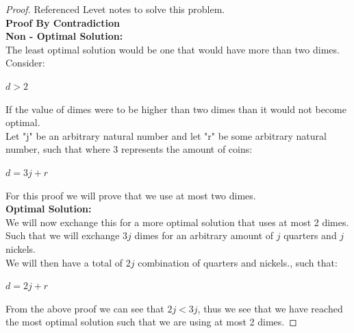 \documentclass[11pt]{article}
\theoremstyle{definition}
\theoremstyle{definition}
\theoremstyle{definition}
\begin{document}
\begin{proof} Referenced Levet notes to solve this problem. \\
\textbf{Proof By Contradiction} \\
\textbf{Non - Optimal Solution:} \\
The least optimal solution would be one that would have more than two dimes. 
Consider:
\begin{center}
$d > 2$
\end{center}
If the value of dimes were to be higher than two dimes than it would not become optimal. \\
Let "j" be an arbitrary natural number and let "r" be some arbitrary natural number, such that where 3 represents the amount of coins: \\
\begin{center}
$d = 3j + r$ 
\end{center}
For this proof we will prove that we use at most two dimes. \\

\textbf{Optimal Solution:}\\
We will now exchange this for a more optimal solution that uses at most 2 dimes. \\
Such that we will exchange $3j$ dimes for an arbitrary amount of $j$ quarters and $j$ nickels. \\
We will then have a total of $2j$ combination of quarters and nickels., such that:
\begin{center}
$d = 2j + r$
\end{center}

From the above proof we can see that $2j < 3j$, thus we see that we have reached the most optimal solution such that we are using at most 2 dimes. 



\end{proof}



\newpage
\end{document}
